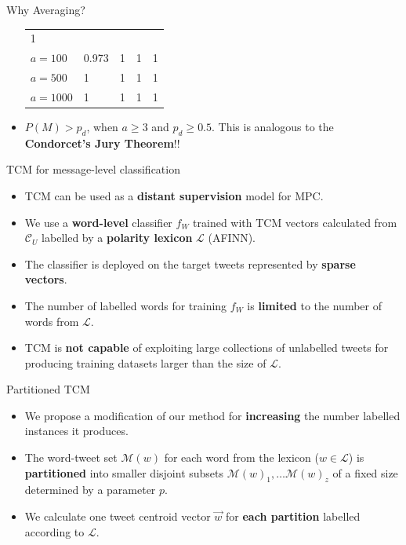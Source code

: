 \documentclass[handout]{beamer}
\begin{document}
\begin{frame}{Why Averaging?}
\begin{scriptsize}
\begin{itemize}
\begin{table}
\begin{center}
{\begin{tabular}{|l|l|l|l|l|}
1 \\ 
$a = 100$ & 0.973 & 1 & 1 & 1 \\ 
$a = 500$ & 1 & 1 & 1 & 1 \\ 
$a = 1000$ & 1 & 1 & 1 & 1 \\ \hline
\end{tabular}}
\end{center}
\end{table}
\item $P(M) > p_d$, when $a \geq 3$ and $p_d \geq 0.5$.  This is analogous to the \textbf{Condorcet's Jury Theorem}!!
\end{itemize}
\end{scriptsize}

\end{frame}



\begin{frame}{TCM for message-level classification}
\begin{scriptsize}
\begin{itemize}
\item TCM can be used as a \textbf{distant supervision} model for MPC.
\item We use a \textbf{word-level} classifier $f_W$ trained with TCM vectors calculated from $\mathcal{C}_U$ labelled by a \textbf{polarity lexicon} $\mathcal{L}$ (AFINN). 
\item The classifier is deployed on the target tweets represented by \textbf{sparse vectors}.
\item The number of labelled words for training $f_W$ is \textbf{limited} to the number of words from $\mathcal{L}$.
\item TCM is \textbf{not capable} of exploiting large collections of unlabelled tweets for producing training datasets larger than the size of $\mathcal{L}$. 
\end{itemize}
\end{scriptsize}
\end{frame}

\begin{frame}{Partitioned TCM}
\begin{scriptsize}
\begin{itemize}
\item We propose a modification of our method for \textbf{increasing} the number labelled instances it produces. 
\item  The word-tweet set $\mathcal{M}(w)$ for each word from the lexicon ($w \in\mathcal{L}$) is \textbf{partitioned} into smaller disjoint subsets $\mathcal{M}(w)_1, \dots \mathcal{M}(w)_z$ of a fixed size determined by a parameter $p$. 
\item We calculate one tweet centroid vector $\overrightarrow{w}$ for \textbf{each partition} labelled according to $\mathcal{L}$.
\end{itemize}
\end{scriptsize}
\end{frame}
\end{document}
